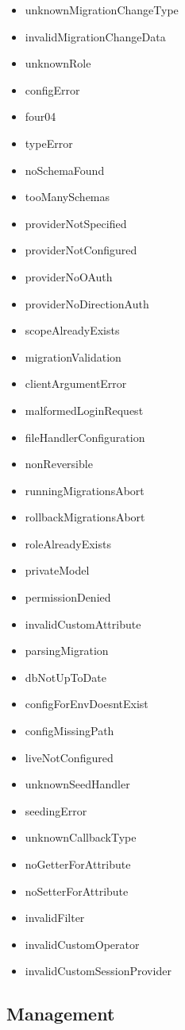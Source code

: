 \documentclass[
  12pt,
]{article}
\begin{document}
\begin{multicols}{2}
\begin{itemize}
\item unknownMigrationChangeType
\item invalidMigrationChangeData
\item unknownRole
\item configError
\item four04
\item typeError
\item noSchemaFound
\item tooManySchemas
\item providerNotSpecified
\item providerNotConfigured
\item providerNoOAuth
\item providerNoDirectionAuth
\item scopeAlreadyExists
\item migrationValidation
\item clientArgumentError
\item malformedLoginRequest
\item fileHandlerConfiguration
\item nonReversible
\item runningMigrationsAbort
\item rollbackMigrationsAbort
\item roleAlreadyExists
\item privateModel
\item permissionDenied
\item invalidCustomAttribute
\item parsingMigration
\item dbNotUpToDate
\item configForEnvDoesntExist
\item configMissingPath
\item liveNotConfigured
\item unknownSeedHandler
\item seedingError
\item unknownCallbackType
\item noGetterForAttribute
\item noSetterForAttribute
\item invalidFilter
\item invalidCustomOperator
\item invalidCustomSessionProvider
\end{itemize}
\end{multicols}

\hypertarget{management}{%
\subsection{Management}\label{management}}
\end{document}

